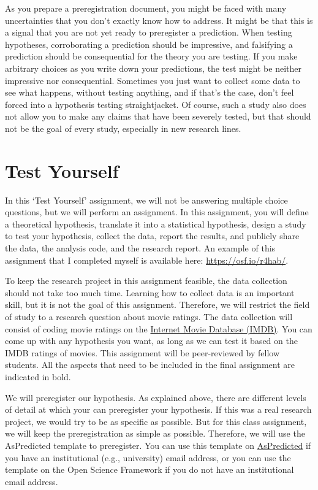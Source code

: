 \documentclass[
  oneside]{book}
\begin{document}
As you prepare a preregistration document, you might be faced with many uncertainties that you don't exactly know how to address. It might be that this is a signal that you are not yet ready to preregister a prediction. When testing hypotheses, corroborating a prediction should be impressive, and falsifying a prediction should be consequential for the theory you are testing. If you make arbitrary choices as you write down your predictions, the test might be neither impressive nor consequential. Sometimes you just want to collect some data to see what happens, without testing anything, and if that's the case, don't feel forced into a hypothesis testing straightjacket. Of course, such a study also does not allow you to make any claims that have been severely tested, but that should not be the goal of every study, especially in new research lines.

\hypertarget{test-yourself-11}{%
\section{Test Yourself}\label{test-yourself-11}}

In this `Test Yourself' assignment, we will not be answering multiple choice questions, but we will perform an assignment. In this assignment, you will define a theoretical hypothesis, translate it into a statistical hypothesis, design a study to test your hypothesis, collect the data, report the results, and publicly share the data, the analysis code, and the research report. An example of this assignment that I completed myself is available here: \url{https://osf.io/r4hab/}.

To keep the research project in this assignment feasible, the data collection should not take too much time. Learning how to collect data is an important skill, but it is not the goal of this assignment. Therefore, we will restrict the field of study to a research question about movie ratings. The data collection will consist of coding movie ratings on the \href{https://www.imdb.com/}{Internet Movie Database (IMDB)}. You can come up with any hypothesis you want, as long as we can test it based on the IMDB ratings of movies. This assignment will be peer-reviewed by fellow students. All the aspects that need to be included in the final assignment are indicated in bold.

We will preregister our hypothesis. As explained above, there are different levels of detail at which your can preregister your hypothesis. If this was a real research project, we would try to be as specific as possible. But for this class assignment, we will keep the preregistration as simple as possible. Therefore, we will use the AsPredicted template to preregister. You can use this template on \href{https://aspredicted.org}{AsPredicted} if you have an institutional (e.g., university) email address, or you can use the template on the Open Science Framework if you do not have an institutional email address.
\end{document}

